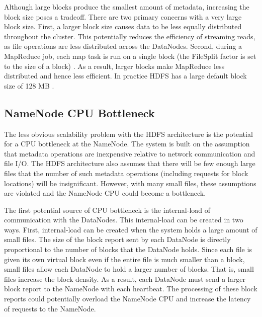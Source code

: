 \documentclass[11pt, a4paper]{article}
\begin{document}
\begin{multicols*}{2}
Although large blocks produce the smallest amount of metadata, increasing the block size poses a tradeoff. There are two primary concerns with a very large block size. First, a larger block size causes data to be less equally distributed throughout the cluster. This potentially reduces the efficiency of streaming reads, as file operations are less distributed across the DataNodes. Second, during a MapReduce job, each map task is run on a single block (the FileSplit factor is set to the size of a block) \cite{HdfsDefaults}. As a result, larger blocks make MapReduce less distributed and hence less efficient. In practice HDFS has a large default block size of 128 MB \cite{HdfsDefaults}.

\subsection{NameNode CPU Bottleneck}
The less obvious scalability problem with the HDFS architecture is the potential for a CPU bottleneck at the NameNode. The system is built on the assumption that metadata operations are inexpensive relative to network communication and file I/O. The HDFS architecture also assumes that there will be few enough large files that the number of such metadata operations (including requests for block locations) will be insignificant. However, with many small files, these assumptions are violated and the NameNode CPU could become a bottleneck.

The first potential source of CPU bottleneck is the internal-load of communication with the DataNodes. This internal-load can be created in two ways. First, internal-load can be created when the system holds a large amount of small files. The size of the block report sent by each DataNode is directly proportional to the number of blocks that the DataNode holds. Since each file is given its own virtual block even if the entire file is much smaller than a block, small files allow each DataNode to hold a larger number of blocks. That is, small files increase the block density. As a result, each DataNode must send a larger block report to the NameNode with each heartbeat. The processing of these block reports could potentially overload the NameNode CPU and increase the latency of requests to the NameNode.


\end{multicols*}
\end{document}
